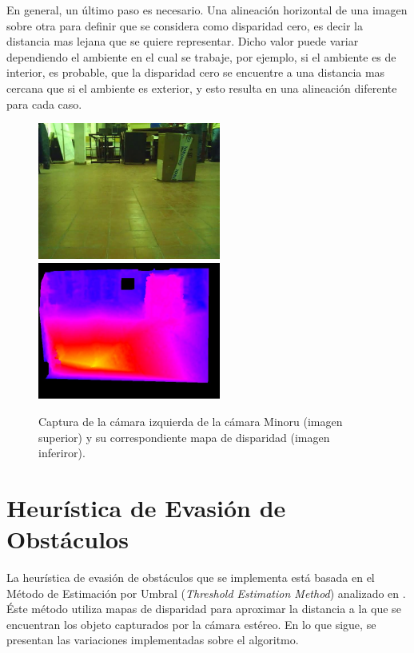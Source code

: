 \documentclass[journal]{IEEEtran}
\begin{document}
En general, un \'ultimo paso es necesario. Una alineaci\'on horizontal de una imagen sobre otra para definir que se considera como disparidad cero, es decir la distancia mas lejana que se quiere representar. Dicho valor puede variar dependiendo el ambiente en el cual se trabaje, por ejemplo, si el ambiente es de interior, es probable, que la disparidad cero se encuentre a una distancia mas cercana que si el ambiente es exterior, y esto resulta en una alineaci\'on diferente para cada caso.


\begin{figure}[ht]
	\begin{center}
		\includegraphics[width=6cm]{./images/original.jpg}
		\includegraphics[width=6cm]{./images/disparidad.jpg}
		\caption{Captura de la c\'amara izquierda de la c\'amara Minoru (imagen superior) y su correspondiente mapa de disparidad (imagen inferiror).}
	\end{center}
\end{figure}

\section{Heur\'istica de Evasi\'on de Obst\'aculos}
\label{sec:heuristica}

La heur\'istica de evasi\'on de obst\'aculos que se implementa est\'a basada en el M\'etodo de Estimaci\'on por Umbral (\emph{Threshold Estimation Method}) analizado en \cite{KNG10}. \'Este m\'etodo utiliza mapas de disparidad para aproximar la distancia a la que se encuentran los objeto capturados por la c\'amara est\'ereo. En lo que sigue, se presentan las variaciones implementadas sobre el algoritmo.
\end{document}
